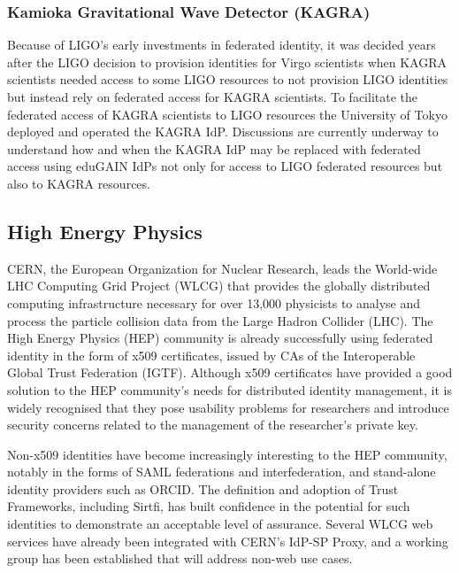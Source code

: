 \documentclass[fleqn,11pt]{wlscirep}
\begin{document}
{\subsubsection{Kamioka Gravitational Wave Detector (KAGRA)}
Because of LIGO's early investments in federated identity, it was decided years after the LIGO decision to provision identities for Virgo scientists when KAGRA scientists needed access to some LIGO resources to not provision LIGO identities but instead rely on federated access for KAGRA scientists. To facilitate the federated access of KAGRA scientists to LIGO resources the University of Tokyo deployed and operated the KAGRA IdP. Discussions are currently underway to understand how and when the KAGRA IdP may be replaced with federated access using eduGAIN IdPs not only for access to LIGO federated resources but also to KAGRA resources.

\subsection{High Energy Physics}
CERN, the European Organization for Nuclear Research, leads the World-wide LHC Computing Grid Project (WLCG) that provides the globally distributed computing infrastructure necessary for over 13,000 physicists to analyse and process the particle collision data from the Large Hadron Collider (LHC). The High Energy Physics (HEP) community is already successfully using federated identity in the form of x509 certificates, issued by CAs of the Interoperable Global Trust Federation (IGTF). Although x509 certificates have provided a good solution to the HEP community’s needs for distributed identity management, it is widely recognised that they pose usability problems for researchers and introduce security concerns related to the management of the researcher’s private key.

Non-x509 identities have become increasingly interesting to the HEP community, notably in the forms of SAML federations and interfederation, and stand-alone identity providers such as ORCID. The definition and adoption of Trust Frameworks, including Sirtfi, has built confidence in the potential for such identities to demonstrate an acceptable level of assurance. Several WLCG web services have already been integrated with CERN’s IdP-SP Proxy, and a working group has been established that will address non-web use cases.

}
\end{document}
